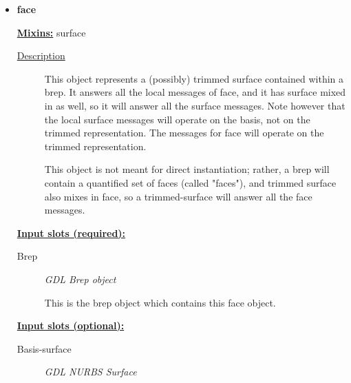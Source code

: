 \documentclass [11pt]{book}
\begin{document}
\begin{itemize}
\begin{description}
\end{description}







\item {}
\label{prim:face}
\textbf{face}


\textbf{
\underline{Mixins:}} surface





\begin{description}

\item [
\underline{Description}]


This object represents a (possibly) trimmed surface contained within a brep. It answers
all the local messages of face, and it has surface mixed in as well, so it will answer all the surface messages. Note 
however that the local surface messages will operate on the basis, not on the trimmed representation. The messages 
for face will operate on the trimmed representation.

This object is not meant for direct instantiation; rather, a brep will contain a quantified set of faces (called "faces"),
and trimmed surface also mixes in face, so a trimmed-surface will answer all the face messages.



\end{description}








\textbf{
\underline{Input slots (required):}}

\begin{description}

\item [Brep]
\emph{GDL Brep object}

 This is the brep object which contains this face object.




\end{description}






\textbf{
\underline{Input slots (optional):}}

\begin{description}

\item [Basis-surface]
\emph{GDL NURBS Surface}


\end{description}
\end{itemize}
\end{document}
